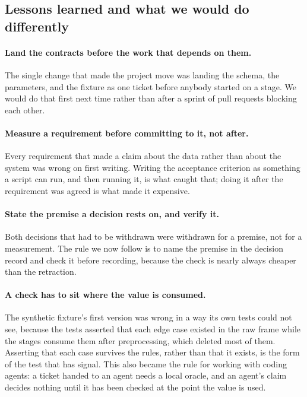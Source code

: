 
\subsection{Lessons learned and what we would do differently}
\label{sec:retro-lessons}

\paragraph{Land the contracts before the work that depends on them.}
The single change that made the project move was landing the schema, the parameters, and the fixture as one ticket before anybody started on a stage.
We would do that first next time rather than after a sprint of pull requests blocking each other.

\paragraph{Measure a requirement before committing to it, not after.}
Every requirement that made a claim about the data rather than about the system was wrong on first writing.
Writing the acceptance criterion as something a script can run, and then running it, is what caught that; doing it after the requirement was agreed is what made it expensive.

\paragraph{State the premise a decision rests on, and verify it.}
Both decisions that had to be withdrawn were withdrawn for a premise, not for a measurement.
The rule we now follow is to name the premise in the decision record and check it before recording, because the check is nearly always cheaper than the retraction.

\paragraph{A check has to sit where the value is consumed.}
The synthetic fixture's first version was wrong in a way its own tests could not see, because the tests asserted that each edge case existed in the raw frame while the stages consume them after preprocessing, which deleted most of them.
Asserting that each case survives the rules, rather than that it exists, is the form of the test that has signal.
This also became the rule for working with coding agents: a ticket handed to an agent needs a local oracle, and an agent's claim decides nothing until it has been checked at the point the value is used.

